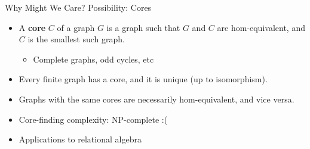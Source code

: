 \documentclass{beamer}
\begin{document}
  \begin{frame}{Why Might We Care? Possibility: Cores}
    \begin{itemize}
      \item A \textbf{core} $C$ of a graph $G$ is a graph such that $G$ and $C$ are hom-equivalent, and $C$ is the smallest such graph.
      \begin{itemize}
        \item Complete graphs, odd cycles, etc
      \end{itemize}
      \item Every finite graph has a core, and it is unique (up to isomorphism).
      \item Graphs with the same cores are necessarily hom-equivalent, and vice versa.
      \item Core-finding complexity: NP-complete :(
      \item Applications to relational algebra
    \end{itemize}
  \end{frame}
  
\end{document}
